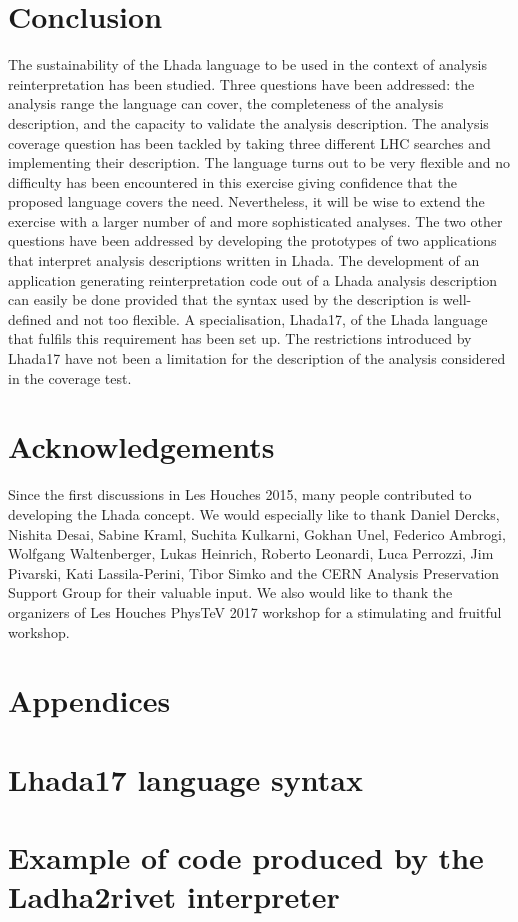 \documentclass[11pt]{cernrep}
\begin{document}
\section{Conclusion}

The sustainability of the {\sc Lhada} language to be used in the context of analysis reinterpretation has been studied. Three questions have been addressed: the analysis range the language can cover, the completeness of the analysis description, and the capacity to validate the analysis description. The analysis coverage question has been tackled by taking three different LHC searches and implementing their description. The language turns out to be very flexible and no difficulty has been encountered in this exercise giving confidence that the proposed language covers the need. Nevertheless, it will be wise to extend the exercise with a larger number of and more sophisticated analyses. The two other questions have been addressed by developing the prototypes of two applications that interpret analysis descriptions written in {\sc Lhada}. The development of an application generating reinterpretation code out of a {\sc Lhada} analysis description can easily be done provided that the syntax used by the description is well-defined and not too flexible. A specialisation, {\sc Lhada17}, of the {\sc Lhada} language that fulfils this requirement has been set up. The restrictions introduced by {\sc Lhada17} have not been a limitation for the description of the analysis considered in the coverage test. 

\section*{Acknowledgements}

Since the first discussions in Les Houches 2015, many people contributed to developing the {\sc Lhada} concept.  
We would especially like to thank Daniel Dercks, Nishita Desai, Sabine Kraml, Suchita Kulkarni, Gokhan Unel, Federico Ambrogi, Wolfgang Waltenberger, Lukas Heinrich, Roberto Leonardi, Luca Perrozzi, Jim Pivarski, Kati Lassila-Perini, Tibor Simko and the CERN Analysis Preservation Support Group for their valuable input.  We also would like to thank the organizers of Les Houches PhysTeV 2017 workshop for a stimulating and fruitful workshop.



\section*{Appendices}

\appendix

\section{{\sc Lhada17} language syntax}\label{app:ebnf}


\section{Example of code produced by the {\sc Ladha2rivet} interpreter}\label{app:code}

\end{document}
